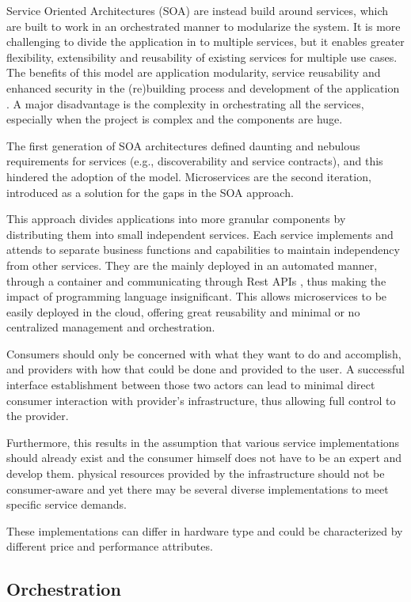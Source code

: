 \documentclass{ieeeaccess}
\begin{document}
Service Oriented Architectures (SOA) are instead build around services, which are built to work in an orchestrated manner to modularize the system. It is more challenging to divide the application in to multiple services, but it enables greater flexibility, extensibility and reusability of existing services for multiple use cases. The benefits of this model are application modularity, service reusability and enhanced security in the (re)building process and development of the application \cite{cloud-to-thing}. A major disadvantage is the complexity in orchestrating all the services, especially when the project is complex and the components are huge.

The first generation of SOA architectures defined daunting and nebulous requirements for services (e.g., discoverability and service contracts), and this hindered the adoption of the model. Microservices are the second iteration, introduced as a solution for the gaps in the SOA approach.

This approach divides applications into more granular components by distributing them into small independent services. Each service implements and attends to separate business functions and capabilities to maintain independency from other services. They are the mainly deployed in an automated manner, through a container and communicating through Rest APIs \cite{rest}, thus making the impact of programming language insignificant. This allows microservices to be easily deployed in the cloud, offering great reusability and minimal or no centralized management and orchestration.

Consumers should only be concerned with what they want to do and accomplish, and providers with how that could be done and provided to the user. A successful interface establishment between those two actors can lead to minimal direct consumer interaction with provider’s infrastructure, thus allowing full control to the provider.

Furthermore, this results in the assumption that various service implementations should already exist and the consumer himself does not have to be an expert and develop them. physical resources provided by the infrastructure should not be consumer-aware and yet there may be several diverse implementations to meet specific service demands.

These implementations can differ in hardware type and could be characterized by different price and performance attributes.

\subsection{Orchestration}
\end{document}
